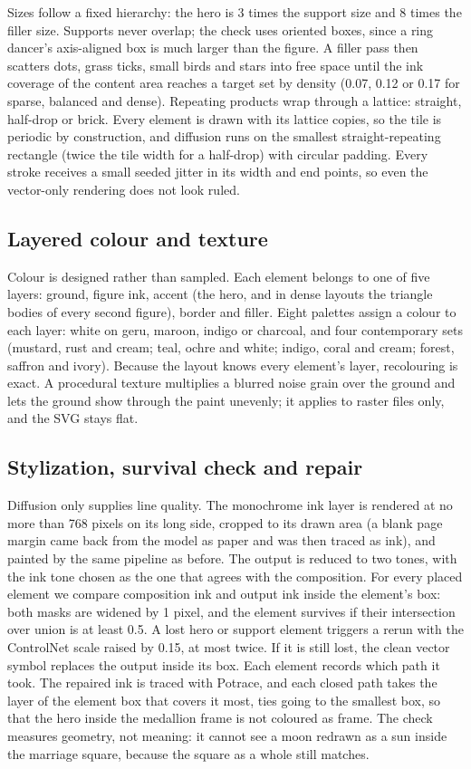 \documentclass[conference]{IEEEtran}
\begin{document}
Sizes follow a fixed hierarchy: the hero is 3 times the support size and 8 times the filler size. Supports never overlap; the check uses oriented boxes, since a ring dancer's axis-aligned box is much larger than the figure. A filler pass then scatters dots, grass ticks, small birds and stars into free space until the ink coverage of the content area reaches a target set by density (0.07, 0.12 or 0.17 for sparse, balanced and dense). Repeating products wrap through a lattice: straight, half-drop or brick. Every element is drawn with its lattice copies, so the tile is periodic by construction, and diffusion runs on the smallest straight-repeating rectangle (twice the tile width for a half-drop) with circular padding. Every stroke receives a small seeded jitter in its width and end points, so even the vector-only rendering does not look ruled.

\subsection{Layered colour and texture}

Colour is designed rather than sampled. Each element belongs to one of five layers: ground, figure ink, accent (the hero, and in dense layouts the triangle bodies of every second figure), border and filler. Eight palettes assign a colour to each layer: white on geru, maroon, indigo or charcoal, and four contemporary sets (mustard, rust and cream; teal, ochre and white; indigo, coral and cream; forest, saffron and ivory). Because the layout knows every element's layer, recolouring is exact. A procedural texture multiplies a blurred noise grain over the ground and lets the ground show through the paint unevenly; it applies to raster files only, and the SVG stays flat.

\subsection{Stylization, survival check and repair}

Diffusion only supplies line quality. The monochrome ink layer is rendered at no more than 768 pixels on its long side, cropped to its drawn area (a blank page margin came back from the model as paper and was then traced as ink), and painted by the same pipeline as before. The output is reduced to two tones, with the ink tone chosen as the one that agrees with the composition. For every placed element we compare composition ink and output ink inside the element's box: both masks are widened by 1 pixel, and the element survives if their intersection over union is at least 0.5. A lost hero or support element triggers a rerun with the ControlNet scale raised by 0.15, at most twice. If it is still lost, the clean vector symbol replaces the output inside its box. Each element records which path it took. The repaired ink is traced with Potrace, and each closed path takes the layer of the element box that covers it most, ties going to the smallest box, so that the hero inside the medallion frame is not coloured as frame. The check measures geometry, not meaning: it cannot see a moon redrawn as a sun inside the marriage square, because the square as a whole still matches.
\end{document}
